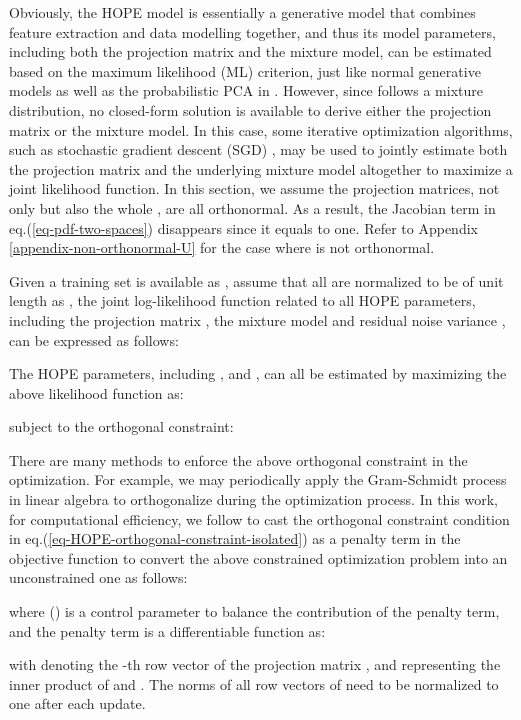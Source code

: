 \documentclass[11pt]{article}
\begin{document}
Obviously, the HOPE model is essentially a generative model that combines feature extraction and data modelling together, and thus its model parameters, including both the projection matrix and the mixture model,  can be estimated based on the maximum likelihood (ML) criterion, just like normal generative models as well as the probabilistic PCA in \cite{Tipping99b}.
However, since  follows a mixture distribution,  no closed-form solution is available to derive either the projection matrix or the mixture model. In this case, some iterative optimization algorithms, such as stochastic gradient descent (SGD) \cite{Bottou04, Bottou11}, may be used to jointly estimate both the projection matrix  and the underlying mixture model altogether to maximize a joint likelihood function. In this section, we assume the projection matrices, not only  but also  the whole , are all orthonormal.  As a result, the Jacobian term in eq.(\ref{eq-pdf-two-spaces}) disappears since it equals to one. Refer to Appendix \ref{appendix-non-orthonormal-U} for the case where  is not orthonormal.

Given a training set is available as , 
assume that all  are normalized to be of unit length as ,
the joint log-likelihood function related to all HOPE parameters, including the projection matrix , the mixture model  and residual noise variance , can be expressed 
as  follows:



The HOPE parameters, including ,  and , can all be estimated by maximizing the above likelihood function as:

subject to the orthogonal constraint: 


There are many methods to enforce the above orthogonal constraint in the optimization. For example, we may periodically apply the Gram-Schmidt process in linear algebra to orthogonalize  during the optimization process. In this work, for computational efficiency, we follow \cite{Bao2013} to cast the orthogonal constraint condition in eq.(\ref{eq-HOPE-orthogonal-constraint-isolated}) as a penalty term in the objective function to convert the above constrained optimization problem into an unconstrained one as follows:

where  () is a control parameter to balance the contribution of the penalty term, and the penalty term  is a differentiable function as:

with  denoting the -th row vector of the projection matrix , and 
 representing the inner product of  and .
The norms of all row vectors of  need to be normalized to one after each update. 
\end{document}
